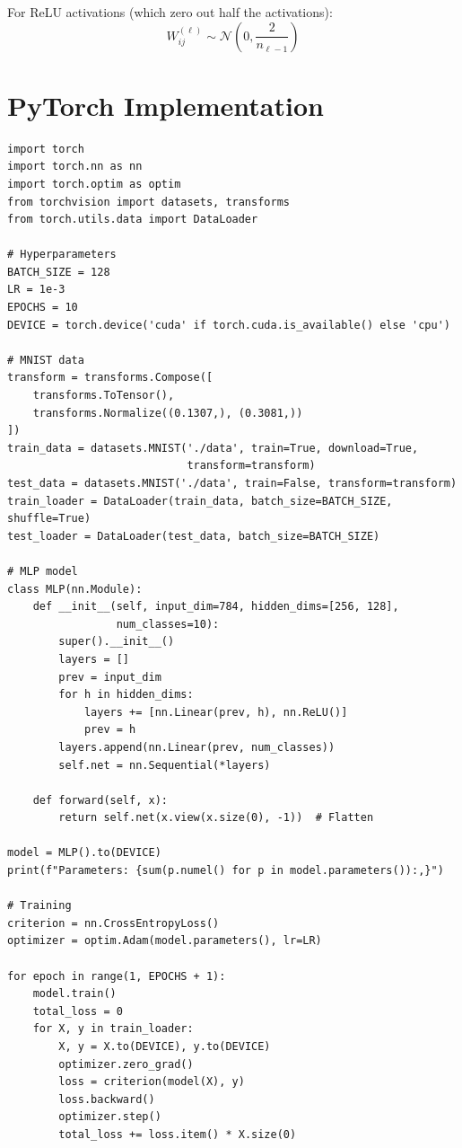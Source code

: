 \begin{mathbox}[title=\textbf{He/Kaiming Initialization (2015)}]
For ReLU activations (which zero out half the activations):
\[
W^{(\ell)}_{ij} \sim \mathcal{N}\!\left(0, \frac{2}{n_{\ell-1}}\right)
\]
\end{mathbox}

\section{PyTorch Implementation}
\label{sec:impl_mlp}

\begin{codeblock}[title=\textbf{MLP in PyTorch --- MNIST Classification}]
\begin{verbatim}
import torch
import torch.nn as nn
import torch.optim as optim
from torchvision import datasets, transforms
from torch.utils.data import DataLoader

# Hyperparameters
BATCH_SIZE = 128
LR = 1e-3
EPOCHS = 10
DEVICE = torch.device('cuda' if torch.cuda.is_available() else 'cpu')

# MNIST data
transform = transforms.Compose([
    transforms.ToTensor(),
    transforms.Normalize((0.1307,), (0.3081,))
])
train_data = datasets.MNIST('./data', train=True, download=True,
                            transform=transform)
test_data = datasets.MNIST('./data', train=False, transform=transform)
train_loader = DataLoader(train_data, batch_size=BATCH_SIZE, shuffle=True)
test_loader = DataLoader(test_data, batch_size=BATCH_SIZE)

# MLP model
class MLP(nn.Module):
    def __init__(self, input_dim=784, hidden_dims=[256, 128],
                 num_classes=10):
        super().__init__()
        layers = []
        prev = input_dim
        for h in hidden_dims:
            layers += [nn.Linear(prev, h), nn.ReLU()]
            prev = h
        layers.append(nn.Linear(prev, num_classes))
        self.net = nn.Sequential(*layers)

    def forward(self, x):
        return self.net(x.view(x.size(0), -1))  # Flatten

model = MLP().to(DEVICE)
print(f"Parameters: {sum(p.numel() for p in model.parameters()):,}")

# Training
criterion = nn.CrossEntropyLoss()
optimizer = optim.Adam(model.parameters(), lr=LR)

for epoch in range(1, EPOCHS + 1):
    model.train()
    total_loss = 0
    for X, y in train_loader:
        X, y = X.to(DEVICE), y.to(DEVICE)
        optimizer.zero_grad()
        loss = criterion(model(X), y)
        loss.backward()
        optimizer.step()
        total_loss += loss.item() * X.size(0)


\end{verbatim}
\end{codeblock}
